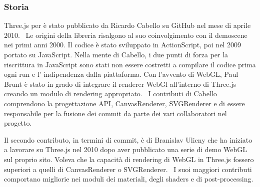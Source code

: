 
\subsubsection{Storia}
Three.js per è stato pubblicato da Ricardo Cabello su GitHub nel mese di aprile 2010.~\cite{Firstcommit}
Le origini della libreria risalgono al suo coinvolgimento con il demoscene nei primi anni 2000.
Il codice \`e stato sviluppato in ActionScript, poi nel 2009 portato su JavaScript. Nella mente di Cabello,
i due punti di forza per la riscrittura in JavaScript sono stati non essere costretti a compilare il codice prima
ogni run e l' indipendenza dalla piattaforma. Con l'avvento di WebGL, Paul Brunt è stato in grado di integrare il renderer
WebGl all'interno di Three.js creando un modulo di rendering appropriato.~\cite{develop}
I contributi di Cabello comprendono la progettazione API, CanvasRenderer, SVGRenderer e di essere
responsabile per la fusione dei commit da parte dei vari collaboratori nel progetto.


Il secondo contributo, in termini di commit, è di Branislav Ulicny che ha iniziato a lavorare su Three.js nel 2010
dopo aver pubblicato una serie di demo WebGL sul proprio sito. Voleva che la capacit\`a di rendering di WebGL in Three.js
fossero superiori a quelli di CanvasRenderer o SVGRenderer.~\cite{develop}
I suoi maggiori contributi comportano migliorie nei moduli dei materiali, degli shaders e di post-processing.

